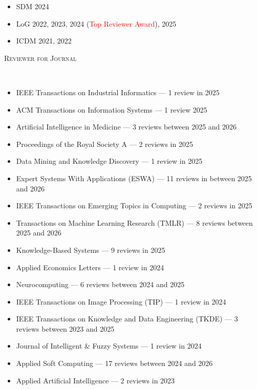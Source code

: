 \documentclass[10pt]{article}
\newenvironment{changemargin}[2]{
  \begin{list}{}{
    \setlength{\topsep}{0pt}
    \setlength{\leftmargin}{#1}
    \setlength{\rightmargin}{#2}
    \setlength{\listparindent}{\parindent}
    \setlength{\itemindent}{\parindent}
    \setlength{\parsep}{\parskip}
  }
  \item[]}{\end{list}
}
\newcommand{\lineover}{
	\begin{changemargin}{-0.05in}{-0.05in}
		\vspace*{-8pt}
		\hrulefill \\
		\vspace*{-2pt}
	\end{changemargin}
}
\newcommand{\RED}[1]{\textcolor{red}{#1}}
\newenvironment{body} {
	\vspace*{-16pt}
	\begin{changemargin}{-0.25in}{-0.5in}
  }
	{\end{changemargin}
}
\begin{document}
\begin{body}
\begin{itemize}
        \item SDM 2024
        \item LoG 2022, 2023, 2024 (\RED{Top Reviewer Award}), 2025
        \item ICDM 2021, 2022
    \end{itemize}
    \vspace{1em}
    \textsc{Reviewer for Journal}
    \lineover
    \begin{itemize}
        \item IEEE Transactions on Industrial Informatics — 1 review in 2025
        \item ACM Transactions on Information Systems — 1 review 2025
        \item Artificial Intelligence in Medicine — 3 reviews between 2025 and 2026
        \item Proceedings of the Royal Society A — 2 reviews in 2025 
        \item Data Mining and Knowledge Discovery — 1 review in 2025
        \item Expert Systems With Applications (ESWA) — 11 reviews in between 2025 and 2026
        \item IEEE Transactions on Emerging Topics in Computing — 2 reviews in 2025
        \item Transactions on Machine Learning Research (TMLR) — 8 reviews between 2025 and 2026 
        \item Knowledge-Based Systems — 9 reviews in 2025
        \item Applied Economics Letters — 1 review in 2024
        \item Neurocomputing — 6 reviews between 2024 and 2025 
        \item IEEE Transactions on Image Processing (TIP) — 1 review in 2024 
        \item IEEE Transactions on Knowledge and Data Engineering (TKDE) — 3 reviews between 2023 and 2025
        \item Journal of Intelligent \& Fuzzy Systems — 1 review in 2024
        \item Applied Soft Computing — 17 reviews between 2024 and 2026
        \item Applied Artificial Intelligence — 2 reviews in 2023

\end{itemize}
\end{body}
\end{document}
